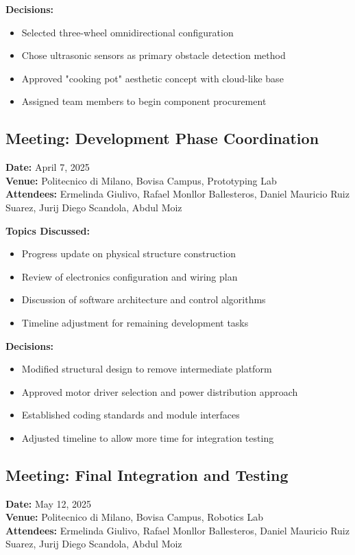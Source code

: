\textbf{Decisions:}
\begin{itemize}
    \item Selected three-wheel omnidirectional configuration
    \item Chose ultrasonic sensors as primary obstacle detection method
    \item Approved "cooking pot" aesthetic concept with cloud-like base
    \item Assigned team members to begin component procurement
\end{itemize}

\subsection{Meeting: Development Phase Coordination}
\textbf{Date:} April 7, 2025\\
\textbf{Venue:} Politecnico di Milano, Bovisa Campus, Prototyping Lab\\
\textbf{Attendees:} Ermelinda Giulivo, Rafael Monllor Ballesteros, Daniel Mauricio Ruiz Suarez, Jurij Diego Scandola, Abdul Moiz

\textbf{Topics Discussed:}
\begin{itemize}
    \item Progress update on physical structure construction
    \item Review of electronics configuration and wiring plan
    \item Discussion of software architecture and control algorithms
    \item Timeline adjustment for remaining development tasks
\end{itemize}

\textbf{Decisions:}
\begin{itemize}
    \item Modified structural design to remove intermediate platform
    \item Approved motor driver selection and power distribution approach
    \item Established coding standards and module interfaces
    \item Adjusted timeline to allow more time for integration testing
\end{itemize}

\subsection{Meeting: Final Integration and Testing}
\textbf{Date:} May 12, 2025\\
\textbf{Venue:} Politecnico di Milano, Bovisa Campus, Robotics Lab\\
\textbf{Attendees:} Ermelinda Giulivo, Rafael Monllor Ballesteros, Daniel Mauricio Ruiz Suarez, Jurij Diego Scandola, Abdul Moiz

